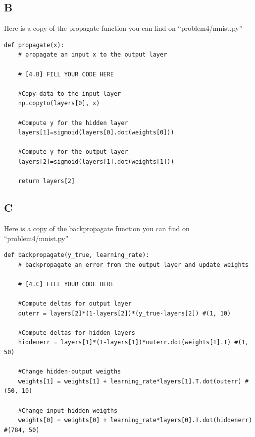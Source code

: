 \documentclass{article}
\begin{document}
        \subsection{B}
            Here is a copy of the propagate function you can find on ``problem4/mnist.py''\\
            \begin{verbatim}
def propagate(x):
    # propagate an input x to the output layer

    # [4.B] FILL YOUR CODE HERE

    #Copy data to the input layer
    np.copyto(layers[0], x)

    #Compute y for the hidden layer
    layers[1]=sigmoid(layers[0].dot(weights[0]))

    #Compute y for the output layer
    layers[2]=sigmoid(layers[1].dot(weights[1]))

    return layers[2]
            \end{verbatim}
        \subsection{C}
            Here is a copy of the backpropagate function you can find on ``problem4/mnist.py''\\
            \begin{verbatim}
def backpropagate(y_true, learning_rate):
    # backpropagate an error from the output layer and update weights

    # [4.C] FILL YOUR CODE HERE

    #Compute deltas for output layer
    outerr = layers[2]*(1-layers[2])*(y_true-layers[2]) #(1, 10)

    #Compute deltas for hidden layers
    hiddenerr = layers[1]*(1-layers[1])*outerr.dot(weights[1].T) #(1, 50)

    #Change hidden-output weigths
    weights[1] = weights[1] + learning_rate*layers[1].T.dot(outerr) #(50, 10)

    #Change input-hidden weigths
    weights[0] = weights[0] + learning_rate*layers[0].T.dot(hiddenerr) #(784, 50)
            \end{verbatim}
\end{document}

